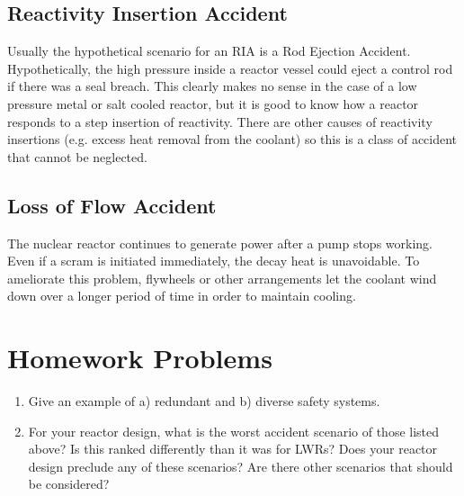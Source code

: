 \subsection{Reactivity Insertion Accident}
Usually the hypothetical scenario for an RIA is a Rod Ejection Accident. Hypothetically, the high pressure inside a reactor vessel could eject a control rod if there was a seal breach.
This clearly makes no sense in the case of a low pressure metal or salt cooled reactor, but it is good to know how a reactor responds to a step insertion of reactivity.
There are other causes of reactivity insertions (e.g. excess heat removal from the coolant) so this is a class of accident that cannot be neglected.

\subsection{Loss of Flow Accident}
The nuclear reactor continues to generate power after a pump stops working. Even if a scram is initiated immediately, the decay heat is unavoidable.
To ameliorate this problem, flywheels or other arrangements let the coolant wind down over a longer period of time in order to maintain cooling.

\section{Homework Problems}
\begin{enumerate}
  \item Give an example of a) redundant and b) diverse safety systems.
  \item For your reactor design, what is the worst accident scenario of those listed above? 
        Is this ranked differently than it was for LWRs?
        Does your reactor design preclude any of these scenarios?
        Are there other scenarios that should be considered?
\end{enumerate}








